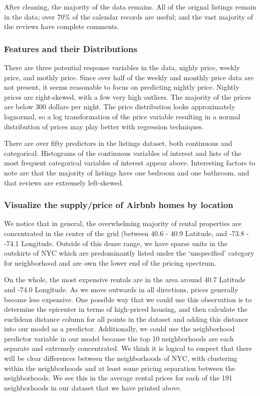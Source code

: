 \documentclass[11pt]{article}
\begin{document}
After cleaning, the majority of the data remains. All of the orignal
listings remain in the data; over 70\% of the calendar records are
useful; and the vast majority of the reviews have complete comments.

\subsubsection{Features and their
Distributions}\label{features-and-their-distributions}

There are three potential response variables in the data, nighly price,
weekly price, and mothly price. Since over half of the weekly and
monthly price data are not present, it seems reasonable to focus on
predicting nightly price. Nightly prices are right-skewed, with a few
very high outliers. The majority of the prices are below 300 dollars per
night. The price distribution looks approximately lognormal, so a log
transformation of the price variable resulting in a normal distribution
of prices may play better with regression techniques.

There are over fifty predictors in the listings dataset, both continuous
and categorical. Histograms of the continuous variables of interest and
lists of the most frequent categorical variables of interest appear
above. Interesting factors to note are that the majority of listings
have one bedroom and one bathroom, and that reviews are extremely
left-skewed.

\subsubsection{Visualize the supply/price of Airbnb homes by
location}\label{visualize-the-supplyprice-of-airbnb-homes-by-location}

We notice that in general, the overwhelming majority of rental
properties are concentrated in the center of the grid (between 40.6 -
40.9 Latitude, and -73.8 - -74.1 Longitude. Outside of this dense range,
we have sparse units in the outskirts of NYC which are predominantly
listed under the `unspecified' category for neighborhood and are own the
lower end of the pricing spectrum.

On the whole, the most expensive rentals are in the area around 40.7
Latitude and -74.0 Longitude. As we move outwards in all directions,
prices generally become less expensive. One possible way that we could
use this observation is to determine the epicenter in terms of
high-priced housing, and then calculate the euclidean distance column
for all points in the dataset and adding this distance into our model as
a predictor. Additionally, we could use the neighborhood predictor
variable in our model because the top 10 neighborhoods are each separate
and extremely concentrated. We think it is logical to suspect that there
will be clear differences between the neighborhoods of NYC, with
clustering within the neighborhoods and at least some pricing separation
between the neighborhoods. We see this in the average rental prices for
each of the 191 neighborhoods in our dataset that we have printed above.
\end{document}
